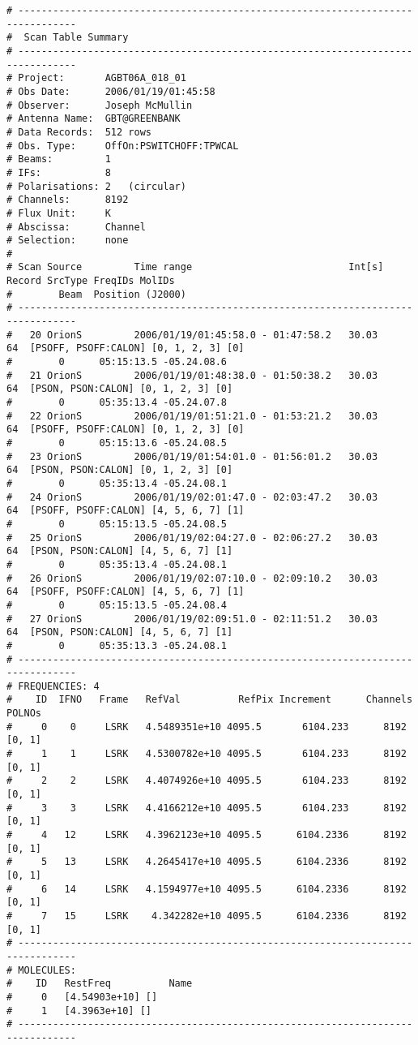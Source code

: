 \scriptsize
\begin{verbatim}
# --------------------------------------------------------------------------------
#  Scan Table Summary
# --------------------------------------------------------------------------------
# Project:       AGBT06A_018_01
# Obs Date:      2006/01/19/01:45:58
# Observer:      Joseph McMullin
# Antenna Name:  GBT@GREENBANK
# Data Records:  512 rows
# Obs. Type:     OffOn:PSWITCHOFF:TPWCAL
# Beams:         1   
# IFs:           8   
# Polarisations: 2   (circular)
# Channels:      8192
# Flux Unit:     K
# Abscissa:      Channel
# Selection:     none
#
# Scan Source         Time range                           Int[s] Record SrcType FreqIDs MolIDs 
#        Beam  Position (J2000)       
# --------------------------------------------------------------------------------
#   20 OrionS         2006/01/19/01:45:58.0 - 01:47:58.2   30.03     64  [PSOFF, PSOFF:CALON] [0, 1, 2, 3] [0]
#        0      05:15:13.5 -05.24.08.6
#   21 OrionS         2006/01/19/01:48:38.0 - 01:50:38.2   30.03     64  [PSON, PSON:CALON] [0, 1, 2, 3] [0]
#        0      05:35:13.4 -05.24.07.8
#   22 OrionS         2006/01/19/01:51:21.0 - 01:53:21.2   30.03     64  [PSOFF, PSOFF:CALON] [0, 1, 2, 3] [0]
#        0      05:15:13.6 -05.24.08.5
#   23 OrionS         2006/01/19/01:54:01.0 - 01:56:01.2   30.03     64  [PSON, PSON:CALON] [0, 1, 2, 3] [0]
#        0      05:35:13.4 -05.24.08.1
#   24 OrionS         2006/01/19/02:01:47.0 - 02:03:47.2   30.03     64  [PSOFF, PSOFF:CALON] [4, 5, 6, 7] [1]
#        0      05:15:13.5 -05.24.08.5
#   25 OrionS         2006/01/19/02:04:27.0 - 02:06:27.2   30.03     64  [PSON, PSON:CALON] [4, 5, 6, 7] [1]
#        0      05:35:13.4 -05.24.08.1
#   26 OrionS         2006/01/19/02:07:10.0 - 02:09:10.2   30.03     64  [PSOFF, PSOFF:CALON] [4, 5, 6, 7] [1]
#        0      05:15:13.5 -05.24.08.4
#   27 OrionS         2006/01/19/02:09:51.0 - 02:11:51.2   30.03     64  [PSON, PSON:CALON] [4, 5, 6, 7] [1]
#        0      05:35:13.3 -05.24.08.1
# --------------------------------------------------------------------------------
# FREQUENCIES: 4
#    ID  IFNO   Frame   RefVal          RefPix Increment      Channels POLNOs
#     0    0     LSRK   4.5489351e+10 4095.5       6104.233      8192  [0, 1]
#     1    1     LSRK   4.5300782e+10 4095.5       6104.233      8192  [0, 1]
#     2    2     LSRK   4.4074926e+10 4095.5       6104.233      8192  [0, 1]
#     3    3     LSRK   4.4166212e+10 4095.5       6104.233      8192  [0, 1]
#     4   12     LSRK   4.3962123e+10 4095.5      6104.2336      8192  [0, 1]
#     5   13     LSRK   4.2645417e+10 4095.5      6104.2336      8192  [0, 1]
#     6   14     LSRK   4.1594977e+10 4095.5      6104.2336      8192  [0, 1]
#     7   15     LSRK    4.342282e+10 4095.5      6104.2336      8192  [0, 1]
# --------------------------------------------------------------------------------
# MOLECULES: 
#    ID   RestFreq          Name           
#     0   [4.54903e+10] []
#     1   [4.3963e+10] []
# --------------------------------------------------------------------------------
\end{verbatim}
